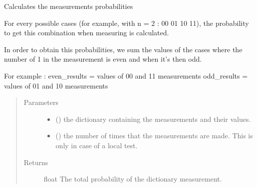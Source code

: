 \documentclass[letterpaper,10pt,english]{sphinxmanual}
\begin{document}
\begin{fulllineitems}
\label{\detokenize{evaluation:mermin_on_qiskit.evaluation.measures_exploitation}}
Calculates the measurements probabilities

For every possible cases (for example, with n = 2 : 00 01 10 11), the 
probability to get this combination when measuring is calculated.

In order to obtain this probabilities, we sum the values of the cases where 
the number of 1 in the measurement is even and when it’s then odd.

For example :
even\_results = values of 00 and 11 measurements
odd\_results = values of 01 and 10 measurements
\begin{quote}\begin{description}
\item[{Parameters}] \leavevmode\begin{itemize}
\item {} 
 () \textendash{} the dictionary containing the measurements 
and their values.

\item {} 
 () \textendash{} the number of times that the measurements are made. This 
is only in case of a local test.

\end{itemize}

\item[{Returns}] \leavevmode
float \textendash{} The total probability of the dictionary measurement.

\end{description}\end{quote}

\end{fulllineitems}

\end{document}
